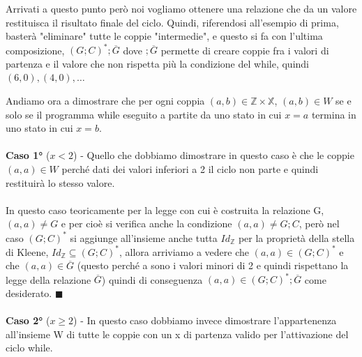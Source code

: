 Arrivati a questo punto però noi vogliamo ottenere una relazione che da un valore restituisca il risultato finale del ciclo. Quindi, riferendosi all'esempio di prima, basterà "eliminare" tutte le coppie "intermedie", e questo si fa con l'ultima composizione, $(G;C)^\ast;\overline{G}$ dove $;\overline{G}$ permette di creare coppie fra i valori di partenza e il valore che non rispetta più la condizione del while, quindi $(6,0), (4,0), \ldots$
\begin{demostration}
    Andiamo ora a dimostrare che per ogni coppia $(a,b) \in \mathbb{Z} \times \mathbb{X}$, $(a,b) \in W$ se e solo se il programma while eseguito a partite da uno stato in cui $x = a$ termina in uno stato in cui $x = b$. \\\\
    
    \textbf{Caso 1°} (\underline{$x < 2$}) - Quello che dobbiamo dimostrare in questo caso è che le coppie $(a,a) \in W$ perché dati dei valori inferiori a 2 il ciclo non parte e quindi restituirà lo stesso valore.\\ \\ In questo caso teoricamente per la legge con cui è costruita la relazione G, $(a,a) \neq G$ e per cioè si verifica anche la condizione $(a,a)\neq G;C$, però nel caso $(G;C)^*$ si aggiunge all'insieme anche tutta $Id_{\mathbb{Z}}$ per la proprietà della stella di Kleene, $Id_{\mathbb{Z}} \subseteq (G;C)^*$, allora arriviamo a vedere che $(a,a) \in (G;C)^*$ e che $(a,a) \in \overline{G}$ (questo perché a sono i valori minori di 2 e quindi rispettano la legge della relazione $\overline{G}$) quindi di conseguenza $(a,a) \in (G;C)^*;\overline{G}$ come desiderato. $\blacksquare$ \\\\
    
    \textbf{Caso 2°} (\underline{$x \geq 2$}) - In questo caso dobbiamo invece dimostrare l'appartenenza all'insieme W di tutte le coppie con un x di partenza valido per l'attivazione del ciclo while.\\\\
    

\end{demostration}
